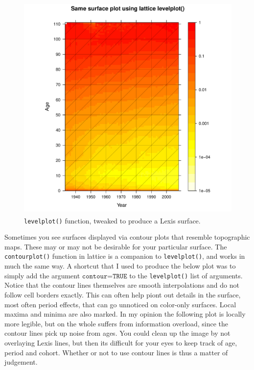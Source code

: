 \begin{figure}[H]
\centering
\includegraphics[width=4.5in,height=4.5in]{figs/latticegood.pdf}
\caption{\texttt{levelplot()} function, tweaked to produce a Lexis surface.}
\end{figure}

Sometimes you see surfaces displayed via contour plots that resemble topographic maps. These may or may not be desirable for your particular surface. The \texttt{contourplot()} function in lattice is a companion to \texttt{levelplot()}, and works in much the same way. A shortcut that I used to produce the below plot was to simply add the argument $\texttt{contour=TRUE}$ to the \texttt{levelplot()} list of arguments. Notice that the contour lines themselves are smooth interpolations and do not follow cell borders exactly. This can often help piont out details in the surface, most often period effects, that can go unnoticed on color-only surfaces. Local maxima and minima are also marked. In my opinion the following plot is locally more legible, but on the whole suffers from information overload, since the contour lines pick up noise from ages. You could clean up the image by not overlaying Lexis lines, but then its difficult for your eyes to keep track of age, period and cohort. Whether or not to use contour lines is thus a matter of judgement.





